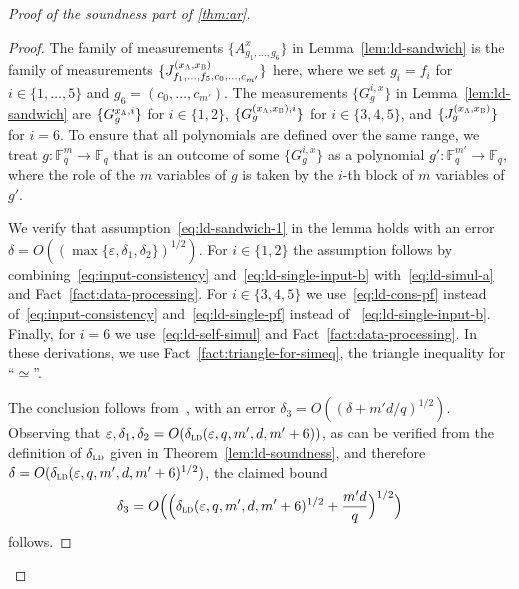 \documentclass[11pt]{article}
\theoremstyle{definition}
\newcommand{\F}{\ensuremath{\mathbb{F}}}
\newcommand{\ld}{\textsc{ld}}
\newcommand{\eps}{\varepsilon}
\newcommand{\labelstyle}[1]{\ensuremath{\textsc{#1}}\xspace}
\newcommand{\alice}{\labelstyle{A}}
\newcommand{\bob}{\labelstyle{B}}
\begin{document}
\begin{proof}[Proof of the soundness part of \cref{thm:ar}]
\begin{proof}
    The family of measurements $\{A^x_{g_1,\ldots,g_6}\}$ in
    Lemma~\ref{lem:ld-sandwich} is the family of measurements
    $\{J^{(x_\alice,x_\bob)}_{f_1,\ldots,f_5,c_0,\ldots,c_{m'}}\}$ here, where
    we set $g_i = f_i$ for $i\in \{1,\ldots,5\}$ and $g_6 =
    (c_0,\ldots,c_{m'})$.
    The measurements $\{G^{i,x}_g\}$ in Lemma~\ref{lem:ld-sandwich} are
    $\{G^{x_\alice,i}_{g}\}$ for $i\in \{1,2\}$,
    $\{G^{(x_\alice,x_\bob),i}_{g}\}$ for $i\in \{3,4,5\}$, and
    $\{J^{(x_\alice,x_\bob)}_g\}$ for $i=6$.
    To ensure that all polynomials are defined over the same range, we treat
    $g:\F_q^m \to \F_q$ that is an outcome of some $\{G^{i,x}_g\}$ as a
    polynomial $g':\F_q^{m'} \to \F_q$, where the role of the $m$ variables of
    $g$ is taken by the $i$-th block of $m$ variables of $g'$.

    We verify that assumption~\eqref{eq:ld-sandwich-1} in the lemma
    holds with an error $\delta = O((\max\{\eps, \delta_1, \delta_2\})^{1/2})$.
    For $i\in\{1,2\}$ the assumption follows by
    combining~\eqref{eq:input-consistency} and~\eqref{eq:ld-single-input-b}
    with~\eqref{eq:ld-simul-a} and Fact~\ref{fact:data-processing}.
    For $i\in \{3,4,5\}$ we use~\eqref{eq:ld-cons-pf} instead
    of~\eqref{eq:input-consistency} and~\eqref{eq:ld-single-pf} instead of
    ~\eqref{eq:ld-single-input-b}.
    Finally, for $i=6$ we use~\eqref{eq:ld-self-simul} and
    Fact~\ref{fact:data-processing}.
    In these derivations, we use Fact~\ref{fact:triangle-for-simeq}, the
    triangle inequality for ``$\simeq$''.

    The conclusion follows from~, with an error
    $\delta_3 = O((\delta + m'd/q)^{1/2})$. Observing that
    $\eps,\delta_1,\delta_2 = O(\delta_{\ld}(\eps,q,m',d,m'+6))$, as can be
    verified from the definition of $\delta_{\ld}$ given in
    Theorem~\ref{lem:ld-soundness}, and therefore $\delta =
    O(\delta_{\ld}(\eps, q,m',d,m'+6)^{1/2})$, the claimed bound
    \[ \delta_3 = O\Big(\Big( \delta_{\ld}(\eps, q, m', d, m'+6)^{1/2} +
      \frac{m'd}{q} \Big)^{1/2} \Big) \]
    follows.

\end{proof}


\end{proof}
\end{document}
